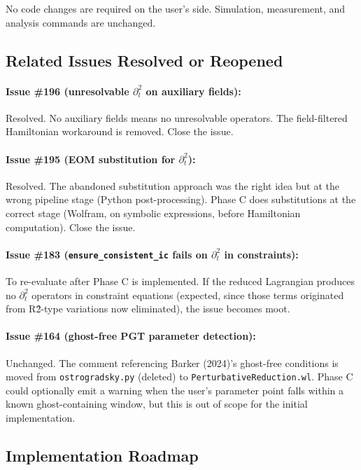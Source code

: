 No code changes are required on the user's side. Simulation, measurement, and analysis commands are unchanged.

\subsection{Related Issues Resolved or Reopened}
\label{sec:prd-issues}

\paragraph{Issue \#196 (unresolvable $\partial_t^2$ on auxiliary fields):} Resolved. No auxiliary fields means no unresolvable operators. The field-filtered Hamiltonian workaround is removed. Close the issue.

\paragraph{Issue \#195 (EOM substitution for $\partial_t^2$):} Resolved. The abandoned substitution approach was the right idea but at the wrong pipeline stage (Python post-processing). Phase C does substitutions at the correct stage (Wolfram, on symbolic expressions, before Hamiltonian computation). Close the issue.

\paragraph{Issue \#183 (\texttt{ensure\_consistent\_ic} fails on $\partial_t^2$ in constraints):} To re-evaluate after Phase C is implemented. If the reduced Lagrangian produces no $\partial_t^2$ operators in constraint equations (expected, since those terms originated from R\^{2}-type variations now eliminated), the issue becomes moot.

\paragraph{Issue \#164 (ghost-free PGT parameter detection):} Unchanged. The comment referencing Barker (2024)'s ghost-free conditions is moved from \texttt{ostrogradsky.py} (deleted) to \texttt{PerturbativeReduction.wl}. Phase C could optionally emit a warning when the user's parameter point falls within a known ghost-containing window, but this is out of scope for the initial implementation.

\subsection{Implementation Roadmap}
\label{sec:prd-roadmap}


